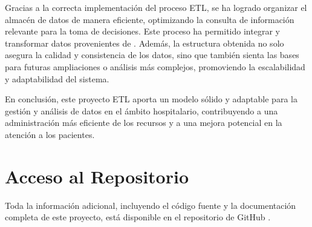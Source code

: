 \documentclass{article}
\begin{document}
	Gracias a la correcta implementación del proceso ETL, se ha logrado organizar el almacén de datos de manera eficiente, optimizando la consulta de información relevante para la toma de decisiones. Este proceso ha permitido integrar y transformar datos provenientes de \cite{eicu_crd}. Además, la estructura obtenida no solo asegura la calidad y consistencia de los datos, sino que también sienta las bases para futuras ampliaciones o análisis más complejos, promoviendo la escalabilidad y adaptabilidad del sistema.
	
	En conclusión, este proyecto ETL aporta un modelo sólido y adaptable para la gestión y análisis de datos en el ámbito hospitalario, contribuyendo a una administración más eficiente de los recursos y a una mejora potencial en la atención a los pacientes.
	
	\newpage
	\section{Acceso al Repositorio}
	
	Toda la información adicional, incluyendo el código fuente y la documentación completa de este proyecto, está disponible en el repositorio de GitHub \cite{silva2024github}.
	
	
\end{document}
